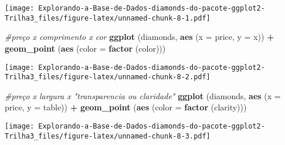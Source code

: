 \documentclass[
]{article}
\newenvironment{Shaded}{\begin{snugshade}}{\end{snugshade}}
\newcommand{\CommentTok}[1]{\textcolor[rgb]{0.56,0.35,0.01}{\textit{#1}}}
\newcommand{\DataTypeTok}[1]{\textcolor[rgb]{0.13,0.29,0.53}{#1}}
\newcommand{\KeywordTok}[1]{\textcolor[rgb]{0.13,0.29,0.53}{\textbf{#1}}}
\newcommand{\NormalTok}[1]{#1}
\newcommand{\OperatorTok}[1]{\textcolor[rgb]{0.81,0.36,0.00}{\textbf{#1}}}
\newcommand{\StringTok}[1]{\textcolor[rgb]{0.31,0.60,0.02}{#1}}
\begin{document}
\texttt{[image: Explorando-a-Base-de-Dados-diamonds-do-pacote-ggplot2-Trilha3\_files/figure-latex/unnamed-chunk-8-1.pdf]}

\begin{Shaded}
\begin{Highlighting}[]
\CommentTok{#preço x comprimento x cor}
\KeywordTok{ggplot}\NormalTok{ (diamonds, }\KeywordTok{aes}\NormalTok{ (}\DataTypeTok{x =}\NormalTok{ price, }\DataTypeTok{y =}\NormalTok{ x)) }\OperatorTok{+}\StringTok{ }\KeywordTok{geom_point}\NormalTok{ (}\KeywordTok{aes}\NormalTok{ (}\DataTypeTok{color =} \KeywordTok{factor}\NormalTok{ (color)))}
\end{Highlighting}
\end{Shaded}

\texttt{[image: Explorando-a-Base-de-Dados-diamonds-do-pacote-ggplot2-Trilha3\_files/figure-latex/unnamed-chunk-8-2.pdf]}

\begin{Shaded}
\begin{Highlighting}[]
\CommentTok{#preço x largura x "transparencia ou claridade"}
\KeywordTok{ggplot}\NormalTok{ (diamonds, }\KeywordTok{aes}\NormalTok{ (}\DataTypeTok{x =}\NormalTok{ price, }\DataTypeTok{y =}\NormalTok{ table)) }\OperatorTok{+}\StringTok{ }\KeywordTok{geom_point}\NormalTok{ (}\KeywordTok{aes}\NormalTok{ (}\DataTypeTok{color =} \KeywordTok{factor}\NormalTok{ (clarity)))}
\end{Highlighting}
\end{Shaded}

\texttt{[image: Explorando-a-Base-de-Dados-diamonds-do-pacote-ggplot2-Trilha3\_files/figure-latex/unnamed-chunk-8-3.pdf]}
\end{document}
